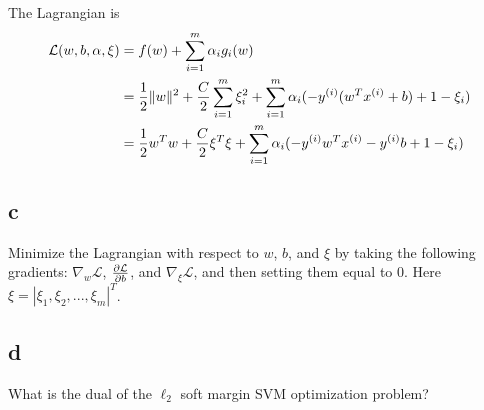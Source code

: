 \documentclass[11pt]{article}
\begin{document}
The Lagrangian is
\begin{align*}
  \mathcal{L}(w,b,\alpha,\xi) &= f(w) + \sum_{i=1}^{m} \alpha_i g_i(w) \\
  &= \frac{1}{2} \|w\|^2 + \frac{C}{2} \sum_{i=1}^{m} \xi_i^2 + \sum_{i=1}^{m} \alpha_i (-y^{(i)} (w^T x^{(i)} + b) + 1 - \xi_i) \\
  &= \frac{1}{2} w^T w + \frac{C}{2} \xi^T \xi + \sum_{i=1}^{m} \alpha_i (-y^{(i)} w^T x^{(i)} - y^{(i)} b + 1 - \xi_i) \\
\end{align*}

\subsection*{c}

Minimize the Lagrangian with respect to $w$, $b$, and $\xi$ by taking the following gradients: $\nabla_w \mathcal{L}$, $\frac{\partial\mathcal{L}}{\partial b}$, and $\nabla_{\xi} \mathcal{L}$, and then setting them equal to $0$. Here $\xi = |\xi_1,\xi_2,...,\xi_m|^{T}$.

\subsection*{d}

What is the dual of the $\ell_2$ soft margin SVM optimization problem?
\end{document}
